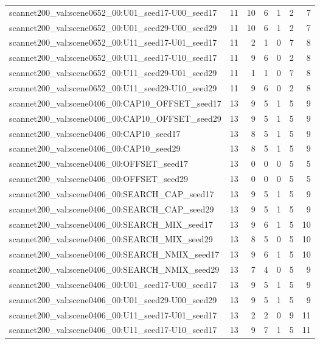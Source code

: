 \begin{table}[t]
\begin{tabular}{lrrrrrr}
scannet200\_val:scene0652\_00:U01\_seed17-U00\_seed17 & 11 & 10 & 6 & 1 & 2 & 7 \\
scannet200\_val:scene0652\_00:U01\_seed29-U00\_seed29 & 11 & 10 & 6 & 1 & 2 & 7 \\
scannet200\_val:scene0652\_00:U11\_seed17-U01\_seed17 & 11 & 2 & 1 & 0 & 7 & 8 \\
scannet200\_val:scene0652\_00:U11\_seed17-U10\_seed17 & 11 & 9 & 6 & 0 & 2 & 8 \\
scannet200\_val:scene0652\_00:U11\_seed29-U01\_seed29 & 11 & 1 & 1 & 0 & 7 & 8 \\
scannet200\_val:scene0652\_00:U11\_seed29-U10\_seed29 & 11 & 9 & 6 & 0 & 2 & 8 \\
scannet200\_val:scene0406\_00:CAP10\_OFFSET\_seed17 & 13 & 9 & 5 & 1 & 5 & 9 \\
scannet200\_val:scene0406\_00:CAP10\_OFFSET\_seed29 & 13 & 9 & 5 & 1 & 5 & 9 \\
scannet200\_val:scene0406\_00:CAP10\_seed17 & 13 & 8 & 5 & 1 & 5 & 9 \\
scannet200\_val:scene0406\_00:CAP10\_seed29 & 13 & 8 & 5 & 1 & 5 & 9 \\
scannet200\_val:scene0406\_00:OFFSET\_seed17 & 13 & 0 & 0 & 0 & 5 & 5 \\
scannet200\_val:scene0406\_00:OFFSET\_seed29 & 13 & 0 & 0 & 0 & 5 & 5 \\
scannet200\_val:scene0406\_00:SEARCH\_CAP\_seed17 & 13 & 9 & 5 & 1 & 5 & 9 \\
scannet200\_val:scene0406\_00:SEARCH\_CAP\_seed29 & 13 & 9 & 5 & 1 & 5 & 9 \\
scannet200\_val:scene0406\_00:SEARCH\_MIX\_seed17 & 13 & 9 & 6 & 1 & 5 & 10 \\
scannet200\_val:scene0406\_00:SEARCH\_MIX\_seed29 & 13 & 8 & 5 & 0 & 5 & 10 \\
scannet200\_val:scene0406\_00:SEARCH\_NMIX\_seed17 & 13 & 9 & 6 & 1 & 5 & 10 \\
scannet200\_val:scene0406\_00:SEARCH\_NMIX\_seed29 & 13 & 7 & 4 & 0 & 5 & 9 \\
scannet200\_val:scene0406\_00:U01\_seed17-U00\_seed17 & 13 & 9 & 5 & 1 & 5 & 9 \\
scannet200\_val:scene0406\_00:U01\_seed29-U00\_seed29 & 13 & 9 & 5 & 1 & 5 & 9 \\
scannet200\_val:scene0406\_00:U11\_seed17-U01\_seed17 & 13 & 2 & 2 & 0 & 9 & 11 \\
scannet200\_val:scene0406\_00:U11\_seed17-U10\_seed17 & 13 & 9 & 7 & 1 & 5 & 11 \\

\end{tabular}
\end{table}
